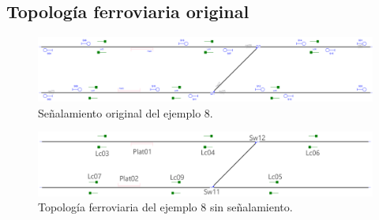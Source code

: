 \subsection{Topología ferroviaria original}

\lipsum[2]


\begin{figure}[H]
	\centering
	\includegraphics[width=1\textwidth]{resultados-obtenidos/ejemplo8/images/8_original.png}
	\centering\caption{Señalamiento original del ejemplo 8.}
\end{figure}

\lipsum[2]

\begin{figure}[H]
	\centering
	\includegraphics[width=1\textwidth]{resultados-obtenidos/ejemplo8/images/8_empty.png}
	\centering\caption{Topología ferroviaria del ejemplo 8 sin señalamiento.}
\end{figure}

\lipsum[2]
